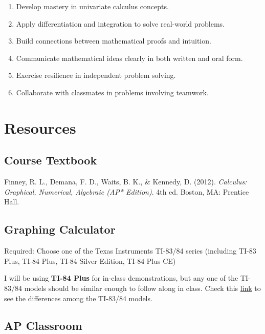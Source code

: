 \documentclass[12pt,fleqn]{article}
\providecommand{\tightlist}{%
  \setlength{\itemsep}{0pt}\setlength{\parskip}{0pt}}
\begin{document}
\begin{enumerate}
\def\labelenumi{\arabic{enumi}.}
\tightlist
\item
  Develop mastery in univariate calculus concepts.
\item
  Apply differentiation and integration to solve real-world problems.
\item
  Build connections between mathematical proofs and intuition.
\item
  Communicate mathematical ideas clearly in both written and oral form.
\item
  Exercise resilience in independent problem solving.
\item
  Collaborate with classmates in problems involving teamwork.
\end{enumerate}

\hypertarget{resources}{%
\section{Resources}\label{resources}}

\hypertarget{course-textbook}{%
\subsection{Course Textbook}\label{course-textbook}}

Finney, R. L., Demana, F. D., Waits, B. K., \& Kennedy, D. (2012).
\emph{Calculus: Graphical, Numerical, Algebraic (AP* Edition)}. 4th ed.
Boston, MA: Prentice Hall.

\hypertarget{graphing-calculator}{%
\subsection{Graphing Calculator}\label{graphing-calculator}}

Required: Choose one of the Texas Instruments TI-83/84 series (including TI-83 Plus, TI-84 Plus, TI-84 Silver Edition, TI-84 Plus CE)

I will be using \textbf{TI-84 Plus} for in-class demonstrations, but any one of the TI-83/84 models should be similar enough to follow along in class. Check this \href{https://brownmath.com/ti83/diff8384.htm\#PlusSilver}{link} to see the differences among the TI-83/84 models.

\hypertarget{ap-classroom}{%
\subsection{AP Classroom}\label{ap-classroom}}
\end{document}

